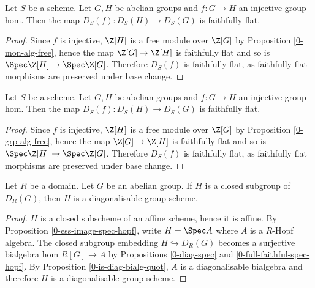 \begin{proposition}
  \label{0-diag-faithful-flat}

  Let $S$ be a scheme.
  Let $G, H$ be abelian groups and $f : G \to H$ an injective group hom.
  Then the map $D_S(f) : D_S(H) \to D_S(G)$ is faithfully flat.
\end{proposition}
\begin{proof}

  Since $f$ is injective, $\Z[H]$ is a free module over $\Z[G]$ by Proposition \ref{0-mon-alg-free},
  hence the map $\Z[G] \to \Z[H]$ is faithfully flat and so is $\Spec \Z[H] \to \Spec \Z[G]$.
  Therefore $D_S(f)$ is faithfully flat,
  as faithfully flat morphisms are preserved under base change.
\end{proof}


\begin{proposition}
  \label{0-diag-faithful-flat}

  Let $S$ be a scheme.
  Let $G, H$ be abelian groups and $f : G \to H$ an injective group hom.
  Then the map $D_S(f) : D_S(H) \to D_S(G)$ is faithfully flat.
\end{proposition}
\begin{proof}

  Since $f$ is injective, $\Z[H]$ is a free module over $\Z[G]$ by Proposition \ref{0-grp-alg-free},
  hence the map $\Z[G] \to \Z[H]$ is faithfully flat and so is $\Spec \Z[H] \to \Spec \Z[G]$.
  Therefore $D_S(f)$ is faithfully flat,
  as faithfully flat morphisms are preserved under base change.
\end{proof}


\begin{proposition}
  \label{0-subgroup-diag}

  Let $R$ be a domain. Let $G$ be an abelian group.
  If $H$ is a closed subgroup of $D_R(G)$, then $H$ is a diagonalisable group scheme.
\end{proposition}
\begin{proof}

  $H$ is a closed subscheme of an affine scheme, hence it is affine.
  By Proposition \ref{0-ess-image-spec-hopf}, write $H = \Spec A$ where $A$ is a $R$-Hopf algebra.
  The closed subgroup embedding $H \hookrightarrow D_R(G)$
  becomes a surjective bialgebra hom $R[G] \to A$ by
  Propositions \ref{0-diag-spec} and \ref{0-full-faithful-spec-hopf}.
  By Proposition \ref{0-is-diag-bialg-quot},
  $A$ is a diagonalisable bialgebra and therefore $H$ is a diagonalisable group scheme.
\end{proof}



